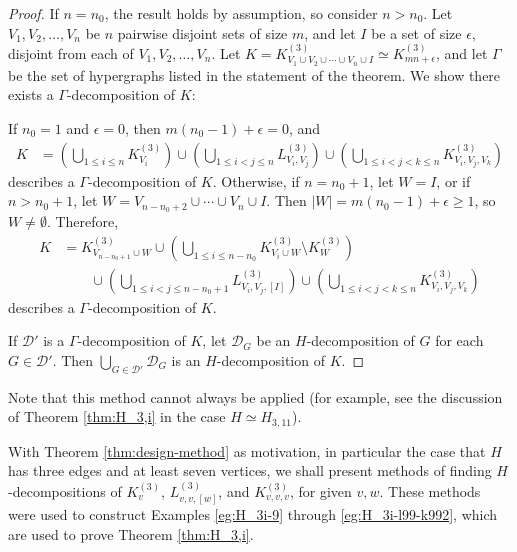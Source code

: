 \begin{proof}
If $n = n_0$, the result holds by assumption, so consider $n > n_0$.
Let $V_1, V_2, \ldots, V_n$ be $n$ pairwise disjoint sets of size $m$, and let $I$ be a set of size $\epsilon$, disjoint from each of $V_1, V_2, \ldots, V_n$.
Let $K = K_{V_1 \cup V_2 \cup \cdots \cup V_n \cup I}^{(3)} \simeq K_{mn + \epsilon}^{(3)}$, and let $\Gamma$ be the set of hypergraphs listed in the statement of the theorem. We show there exists a $\Gamma$-decomposition of $K$:

If $n_0 = 1$ and $\epsilon = 0$, then $m(n_0-1)+\epsilon = 0$, and
\begin{align*}
    K &= \left( \bigcup_{1 \leq i \leq n} K_{V_i}^{(3)} \right)
    \cup \left( \bigcup_{1 \leq i < j \leq n} L_{V_i,V_j}^{(3)} \right)
    \cup \left( \bigcup_{1 \leq i < j < k \leq n} K_{V_i,V_j,V_k}^{(3)} \right)
\end{align*}
describes a $\Gamma$-decomposition of $K$. Otherwise, if $n = n_0 + 1$, let $W = I$, or if $n > n_0 + 1$, let $W = V_{n-n_0+2} \cup \cdots \cup V_{n} \cup I$. Then $|W| = m(n_0-1)+\epsilon \geq 1$, so $W \neq \emptyset$. Therefore,
\begin{align*}
    K &= K_{V_{n-n_0+1} \cup W}^{(3)}
    \cup \left( \bigcup_{1 \leq i \leq n-n_0} K_{V_i \cup W}^{(3)} \setminus K_{W}^{(3)} \right)
    \\ & \quad \quad
    \cup \left( \bigcup_{1 \leq i < j \leq n-n_0+1} L_{V_i,V_j,[I]}^{(3)} \right)
    \cup \left( \bigcup_{1 \leq i < j < k \leq n} K_{V_i,V_j,V_k}^{(3)} \right)
\end{align*}
describes a $\Gamma$-decomposition of $K$.

If $\mathcal{D}'$ is a $\Gamma$-decomposition of $K$, let $\mathcal{D}_G$ be an $H$-decomposition of $G$ for each $G \in \mathcal{D}'$.
Then $\bigcup_{G \in \mathcal{D}'} \mathcal{D}_G$ is an $H$-decomposition of $K$.
\end{proof}

Note that this method cannot always be applied (for example, see the discussion of Theorem \ref{thm:H_3,i} in the case $H \simeq H_{3,11}$).

With Theorem \ref{thm:design-method} as motivation, in particular the case that $H$ has three edges and at least seven vertices, we shall present methods of finding $H$-decompositions of $K_{v}^{(3)}$, $L_{v,v,[w]}^{(3)}$, and $K_{v,v,v}^{(3)}$, for given $v, w$.
These methods were used to construct Examples \ref{eg:H_3i-9} through \ref{eg:H_3i-l99-k992}, which are used to prove Theorem \ref{thm:H_3,i}.

